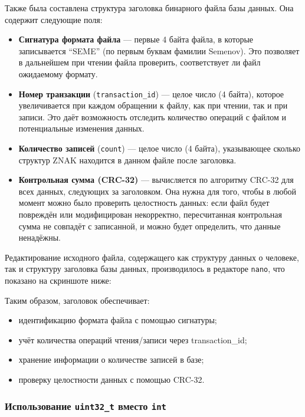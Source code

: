 Также была составлена структура заголовка бинарного файла базы данных. Она содержит следующие поля:
\begin{itemize}
  \item \textbf{Сигнатура формата файла} --- первые 4 байта файла, в которые записывается ``SEME'' (по первым буквам фамилии Semenov). Это позволяет в дальнейшем при чтении файла проверить, соответствует ли файл ожидаемому формату.
  
  \item \textbf{Номер транзакции} (\texttt{transaction\_id}) --- целое число (4 байта), которое увеличивается при каждом обращении к файлу, как при чтении, так и при записи. Это даёт возможность отследить количество операций с файлом и потенциальные изменения данных.
  
  \item \textbf{Количество записей} (\texttt{count}) --- целое число (4 байта), указывающее сколько структур ZNAK находится в данном файле после заголовка.
  
  \item \textbf{Контрольная сумма (CRC-32)} --- вычисляется по алгоритму CRC-32 для всех данных, следующих за заголовком. Она нужна для того, чтобы в любой момент можно было проверить целостность данных: если файл будет повреждён или модифицирован некорректно, пересчитанная контрольная сумма не совпадёт с записанной, и можно будет определить, что данные ненадёжны.
\end{itemize}

Редактирование исходного файла, содержащего как структуру данных о человеке, так и структуру заголовка базы данных, производилось в редакторе \texttt{nano}, что показано на скриншоте ниже:


Таким образом, заголовок обеспечивает:
\begin{itemize}
  \item идентификацию формата файла с помощью сигнатуры;
  \item учёт количества операций чтения/записи через transaction\_id;
  \item хранение информации о количестве записей в базе;
  \item проверку целостности данных с помощью CRC-32.
\end{itemize}

\subsubsection*{Использование \texttt{uint32\_t} вместо \texttt{int}}

